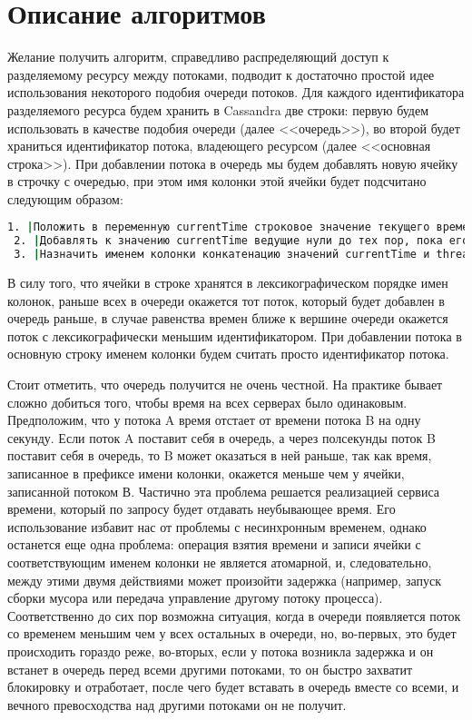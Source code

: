 \section{Описание алгоритмов}

Желание получить алгоритм, справедливо распределяющий доступ к разделяемому ресурсу между потоками, подводит к достаточно простой идее использования некоторого подобия очереди потоков.
Для каждого идентификатора разделяемого ресурса будем хранить в Cassandra две строки: первую будем использовать в качестве подобия очереди (далее <<очередь>>), во второй будет храниться идентификатор потока, владеющего ресурсом (далее <<основная строка>>).
При добавлении потока в очередь мы будем добавлять новую ячейку в строчку с очередью, при этом имя колонки этой ячейки будет подсчитано следующим образом:

\begin{lstlisting}[language=csh,caption={Определение имени колонки для ячейки в очереди}]
 1. |Положить в переменную currentTime строковое значение текущего времени в микросекундах|
 2. |Добавлять к значению currentTime ведущие нули до тех пор, пока его длина не станет равной 20|
 3. |Назначить именем колонки конкатенацию значений currentTime и threadId|
\end{lstlisting}

В силу того, что ячейки в строке хранятся в лексикографическом порядке имен колонок, раньше всех в очереди окажется тот поток, который будет добавлен в очередь раньше, в случае равенства времен ближе к вершине очереди окажется поток с лексикографически меньшим идентификатором.
При добавлении потока в основную строку именем колонки будем считать просто идентификатор потока.

Стоит отметить, что очередь получится не очень честной. На практике бывает сложно добиться того, чтобы время на всех серверах было одинаковым. Предположим, что у потока A время отстает от времени потока B на одну секунду. Если поток A поставит себя в очередь, а через полсекунды поток B поставит себя в очередь, то B может оказаться в ней раньше, так как время, записанное в префиксе имени колонки, окажется меньше чем у ячейки, записанной потоком В. Частично эта проблема решается реализацией сервиса времени, который по запросу будет отдавать неубывающее время. Его использование избавит нас от проблемы с несинхронным временем, однако останется еще одна проблема: операция взятия времени и записи ячейки с соответствующим именем колонки не является атомарной, и, следовательно, между этими двумя действиями может произойти задержка (например, запуск сборки мусора или передача управление другому потоку процесса). Соответственно до сих пор возможна ситуация, когда в очереди появляется поток со временем меньшим чем у всех остальных в очереди, но, во-первых, это будет происходить гораздо реже, во-вторых, если у потока возникла задержка и он встанет в очередь перед всеми другими потоками, то он быстро захватит блокировку и отработает, после чего будет вставать в очередь вместе со всеми, и вечного превосходства над другими потоками он не получит.
